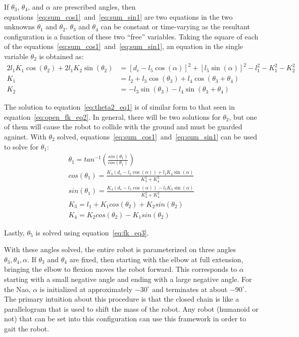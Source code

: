 If $\theta_3$, $\theta_4$, and $\alpha$ are prescribed angles, then equations~\ref{eq:sum_cos1}~and~\ref{eq:sum_sin1} are two equations 
in the two unknowns $\theta_1$ and $\theta_2$. 
$\theta_3$ and $\theta_4$ can be constant or time-varying as the resultant configuration is a function of 
these two ``free'' variables.
Taking the square of each of the equations~\ref{eq:sum_cos1}~and~\ref{eq:sum_sin1}, 
an equation in the single variable $\theta_2$ is obtained as:
\begin{align}
	2l_1 K_1 \cos(\theta_2) + 2l_1K_2 \sin(\theta_2) &= [d_e - l_5 \cos(\alpha)]^2 + [l_5 \sin(\alpha)]^2 - l_1^2 - K_1^2 - K_2^2 \label{eq:theta2_eq1} \\
	K_1 &= l_2 + l_3 \cos(\theta_3) + l_4 \cos(\theta_3 + \theta_4) \label{eq:theta2_eq2}\\
	K_2 &= -l_3 \sin(\theta_3) - l_4 \sin(\theta_3 + \theta_4) \label{eq:theta2_eq3}
\end{align}

The solution to equation~\ref{eq:theta2_eq1} is of similar form to that seen in equation~\ref{eq:open_fk_eq2}.
In general, there will be two solutions for $\theta_2$, but one of them will cause the robot to collide
with the ground and must be guarded against.
With $\theta_2$ solved, equations~\ref{eq:sum_cos1}~and~\ref{eq:sum_sin1} can be used to solve for $\theta_1$:
\begin{align}
	\theta_1 = tan^{-1} \left( \frac{sin(\theta_1)}{cos(\theta_1)} \right ) \label{eq:theta1_eq1}\\
	cos(\theta_1) = \frac{K_3 (d_e - l_5 \cos(\alpha)) + l_5 K_4 \sin(\alpha)}{K_3^2 + K_4^2} \label{eq:theta1_eq2}\\
	sin(\theta_1) = \frac{K_4 (d_e - l_5 \cos(\alpha)) - l_5 K_3 \sin(\alpha)}{K_3^2 + K_4^2} \label{eq:theta1_eq3}\\
	K_3 = l_1 + K_1 cos(\theta_2) + K_2 sin(\theta_2) \label{eq:theta1_eq4}\\
	K_4 = K_2 cos(\theta_2) - K_1 sin(\theta_2) \label{eq:theta1_eq5}
\end{align}

Lastly, $\theta_5$ is solved using equation~\ref{eq:fk_eq3}.

With these angles solved, the entire robot is parameterized on three angles $\theta_3, \theta_4, \alpha$.
If $\theta_3$ and $\theta_4$ are fixed, then starting with the elbow at full extension, bringing the elbow
to flexion moves the robot forward. This corresponds to $\alpha$ starting with a small negative angle and 
ending with a large negative angle. 
For the Nao, $\alpha$ is initialized at approximately $-30^\circ$ and terminates at about $-90^\circ$.
The primary intuition about this procedure is that the closed chain is like a parallelogram that is used to shift
the mass of the robot. Any robot (humanoid or not) that can be set into this configuration can use this 
framework in order to gait the robot.

